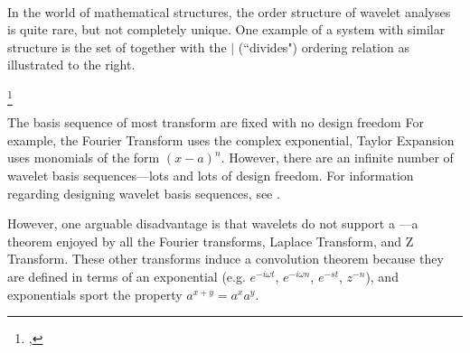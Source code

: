 \mbox{}\\
\begin{minipage}{\tw-65mm}%
  In the world of mathematical structures,
  the order structure of wavelet analyses is quite rare, but not completely unique.
  One example of a system with similar structure is the set of 
  together with the $|$ (``divides") ordering relation\footnotemark
  as illustrated to the right. %
\end{minipage}%
\footnote{%
  ,
  }%
\hfill%
%

The basis sequence of most transform are fixed with no design freedom 
For example, the Fourier Transform uses the complex exponential, Taylor Expansion uses 
monomials of the form $(x-a)^n$.
However, there are an infinite number of wavelet basis sequences---lots and lots of design freedom.
For information regarding designing wavelet basis sequences, see .

However, one arguable disadvantage is that wavelets do not support a ---a theorem 
enjoyed by all the Fourier transforms, Laplace Transform, and Z Transform.
These other transforms induce a convolution theorem because they are defined in terms of an exponential
(e.g. $e^{-i\omega t}$, $e^{-i\omega n}$, $e^{-st}$, $z^{-n}$),
and exponentials sport the property $a^{x+y}=a^xa^y$.
